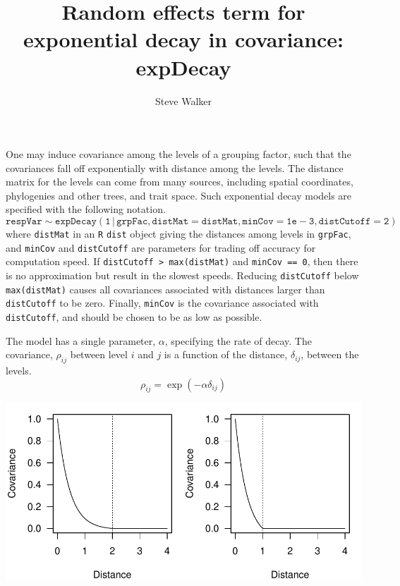 \documentclass{article}\usepackage[]{graphicx}\usepackage[]{color}
\title{Random effects term for exponential decay in covariance: expDecay}
\author{Steve Walker}
\date{}
\makeatletter
\def\maxwidth{ %
  \ifdim\Gin@nat@width>\linewidth
    \linewidth
  \else
    \Gin@nat@width
  \fi
}
\newenvironment{knitrout}{}{} %
\newcommand{\code}[1]{\texttt{#1}}
\makeatother
\begin{document}
\maketitle

One may induce covariance among the levels of a grouping factor, such
that the covariances fall off exponentially with distance among the
levels.  The distance matrix for the levels can come from many
sources, including spatial coordinates, phylogenies and other trees,
and trait space.  Such exponential decay models are specified with the
following notation.
\begin{equation}
  \label{eq:6}
  \mathtt{
    respVar \sim expDecay(1\, | \,grpFac, 
    distMat = distMat, 
    minCov = 1e-3,
    distCutoff = 2)}
\end{equation}
where \code{distMat} in an \code{R} \code{dist} object giving the
distances among levels in \code{grpFac}, and \code{minCov} and
\code{distCutoff} are parameters for trading off accuracy for
computation speed.  If \code{distCutoff > max(distMat)} and
\code{minCov == 0}, then there is no approximation but result in the
slowest speeds.  Reducing \code{distCutoff} below \code{max(distMat)}
causes all covariances associated with distances larger than
\code{distCutoff} to be zero.  Finally, \code{minCov} is the
covariance associated with \code{distCutoff}, and should be chosen to
be as low as possible.

The model has a single parameter, $\alpha$, specifying the rate of
decay.  The covariance, $\rho_{ij}$ between level $i$ and $j$ is a
function of the distance, $\delta_{ij}$, between the levels.
\begin{equation}
  \label{eq:1}
  \rho_{ij} = \exp\left(-\alpha\delta_{ij}\right)
\end{equation}

\begin{knitrout}
\color{fgcolor}
\includegraphics[width=\maxwidth]{figure/decayGraph-1} 

\end{knitrout}
\end{document}
